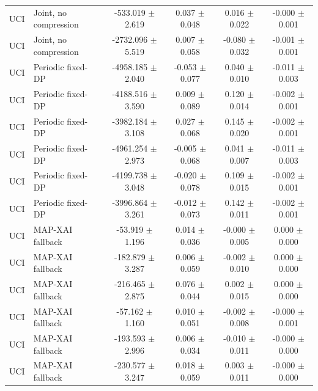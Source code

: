 \begin{tabular}{llcccc}
UCI & Joint, no compression & -533.019 $\pm$ 2.619 & 0.037 $\pm$ 0.048 & 0.016 $\pm$ 0.022 & -0.000 $\pm$ 0.001 \\
UCI & Joint, no compression & -2732.096 $\pm$ 5.519 & 0.007 $\pm$ 0.058 & -0.080 $\pm$ 0.032 & -0.001 $\pm$ 0.001 \\
UCI & Periodic fixed-DP & -4958.185 $\pm$ 2.040 & -0.053 $\pm$ 0.077 & 0.040 $\pm$ 0.010 & -0.011 $\pm$ 0.003 \\
UCI & Periodic fixed-DP & -4188.516 $\pm$ 3.590 & 0.009 $\pm$ 0.089 & 0.120 $\pm$ 0.014 & -0.002 $\pm$ 0.001 \\
UCI & Periodic fixed-DP & -3982.184 $\pm$ 3.108 & 0.027 $\pm$ 0.068 & 0.145 $\pm$ 0.020 & -0.002 $\pm$ 0.001 \\
UCI & Periodic fixed-DP & -4961.254 $\pm$ 2.973 & -0.005 $\pm$ 0.068 & 0.041 $\pm$ 0.007 & -0.011 $\pm$ 0.003 \\
UCI & Periodic fixed-DP & -4199.738 $\pm$ 3.048 & -0.020 $\pm$ 0.078 & 0.109 $\pm$ 0.015 & -0.002 $\pm$ 0.001 \\
UCI & Periodic fixed-DP & -3996.864 $\pm$ 3.261 & -0.012 $\pm$ 0.073 & 0.142 $\pm$ 0.011 & -0.002 $\pm$ 0.001 \\
UCI & MAP-XAI fallback & -53.919 $\pm$ 1.196 & 0.014 $\pm$ 0.036 & -0.000 $\pm$ 0.005 & 0.000 $\pm$ 0.000 \\
UCI & MAP-XAI fallback & -182.879 $\pm$ 3.287 & 0.006 $\pm$ 0.059 & -0.002 $\pm$ 0.010 & 0.000 $\pm$ 0.000 \\
UCI & MAP-XAI fallback & -216.465 $\pm$ 2.875 & 0.076 $\pm$ 0.044 & 0.002 $\pm$ 0.015 & 0.000 $\pm$ 0.000 \\
UCI & MAP-XAI fallback & -57.162 $\pm$ 1.160 & 0.010 $\pm$ 0.051 & -0.002 $\pm$ 0.008 & -0.000 $\pm$ 0.001 \\
UCI & MAP-XAI fallback & -193.593 $\pm$ 2.996 & 0.006 $\pm$ 0.034 & -0.010 $\pm$ 0.011 & -0.000 $\pm$ 0.000 \\
UCI & MAP-XAI fallback & -230.577 $\pm$ 3.247 & 0.018 $\pm$ 0.059 & 0.003 $\pm$ 0.011 & -0.000 $\pm$ 0.000 \\
\bottomrule
\end{tabular}

